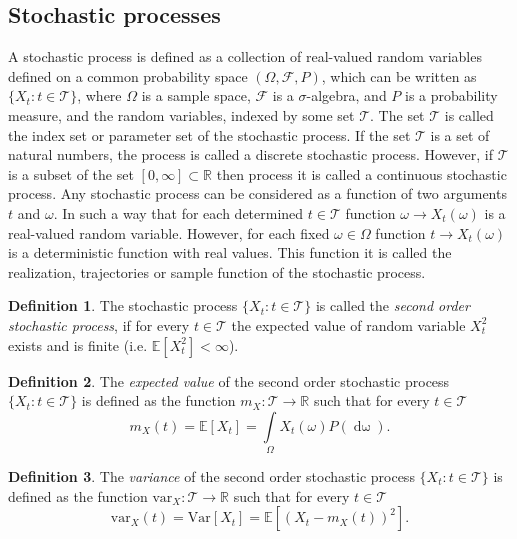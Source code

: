 \documentclass[review]{elsarticle}
\theoremstyle{definition}
\newtheorem{definition}{Definition}
\theoremstyle{theorem}
\DeclareMathOperator*{\dom}{d\omega}
\begin{document}
\subsection{Stochastic processes}
A stochastic process is defined as a collection of real-valued random  variables defined on a  common  probability  space $(\Omega, \mathcal{F}, P)$, which can be written as $\{X_t\colon t\in\mathcal{T}\}$, where $\Omega$ is  a  sample  space, $\mathcal{F}$ is a $\sigma$-algebra, and $P$ is a probability measure, and the random variables, indexed by some set $\mathcal{T}$. The set $\mathcal{T}$ is called the index set  or parameter set of the stochastic process. If the set $\mathcal{T}$ is a set of natural numbers, the process is called a discrete stochastic process. However, if $\mathcal{T}$ is a subset of the set $[0, \infty] \subset\mathbb{R}$ then process it is called a continuous stochastic process. Any stochastic process can be considered as a function of two arguments $t$ and $\omega$. In such a way that for each determined $t\in\mathcal{T}$ function $\omega\to X_t(\omega)$ is a real-valued random variable. However, for each fixed $\omega \in \Omega$ function $t\to X_t(\omega)$ is a deterministic function with real values. This function it is called the realization, trajectories or sample function of the stochastic process.\cite{florescu2014, Minier2014, GABBIANI2017}

\begin{definition}
The stochastic process $\{X_t\colon t\in\mathcal{T}\}$ is called the {\it second order stochastic process}, if for every $t\in\mathcal{T}$ the expected value of random variable $X_t^2$ exists and is finite (i.e. $\mathbb{E}[X_t^2]<\infty$).
\end{definition}

\begin{definition}
The {\it expected value} of the second order stochastic process $\{X_t\colon t\in\mathcal{T}\}$ is defined as the function $m_X\colon\mathcal{T} \to\mathbb{R}$ such that for every $t\in\mathcal{T}$
\begin{equation}
\label{eq:13}
m_X(t) = \mathbb{E}[X_t] = \int\limits_{\Omega}X_t(\omega)P(\dom).
\end{equation}
\end{definition}

\begin{definition}
The {\it variance} of the second order stochastic process \linebreak $\{X_t\colon t\in\mathcal{T}\}$ is defined as the function $\mathrm{var}_X\colon\mathcal{T}\to\mathbb{R}$ such that for every $t\in\mathcal{T}$
\begin{equation}
\mathrm{var}_X(t) = \mathrm{Var}[X_t] = \mathbb{E}[(X_t-m_X(t))^2].
\end{equation}
\end{definition}
\end{document}
